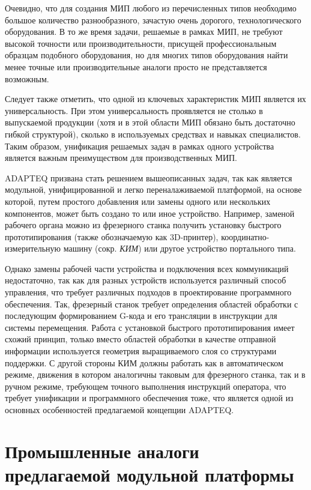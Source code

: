 Очевидно, что для создания МИП любого из перечисленных типов необходимо большое количество разнообразного, зачастую очень дорогого, технологического оборудования. В то же время задачи, решаемые в рамках МИП, не требуют высокой точности или производительности, присущей профессиональным образцам подобного оборудования, но для многих типов оборудования найти менее точные или производительные аналоги просто не представляется возможным.

Следует также отметить, что одной из ключевых характеристик МИП является их универсальность. При этом универсальность проявляется не столько в выпускаемой продукции (хотя и в этой области МИП обязано быть достаточно гибкой структурой), сколько в используемых средствах и навыках специалистов. Таким образом, унификация решаемых задач в рамках одного устройства является важным преимуществом для производственных МИП.

ADAPTEQ призвана стать решением вышеописанных задач, так как является модульной, унифицированной и легко переналаживаемой платформой, на основе которой, путем простого добавления или замены одного или нескольких компонентов, может быть создано то или иное устройство. Например, заменой рабочего органа можно из фрезерного станка получить установку быстрого прототипирования (также обозначаемую как 3D-принтер), координатно-измерительную машину (сокр. \textit{КИМ}) или другое устройство портального типа.

Однако замены рабочей части устройства и подключения всех коммуникаций недостаточно, так как для разных устройств используется различный способ управления, что требует различных подходов в проектирование программного обеспечения. Так, фрезерный станок требует определения областей обработки с последующим формированием G-кода и его трансляции в инструкции для системы перемещения. Работа с установкой быстрого прототипирования имеет схожий принцип, только вместо областей обработки в качестве отправной информации используется геометрия выращиваемого слоя со структурами поддержки. С другой стороны КИМ должны работать как в автоматическом режиме, движения в котором аналогичны таковым для фрезерного станка, так и в ручном режиме, требующем точного выполнения инструкций оператора, что требует унификации и программного обеспечения тоже, что является одной из основных особенностей предлагаемой концепции ADAPTEQ.

\section{Промышленные аналоги предлагаемой модульной платформы}


